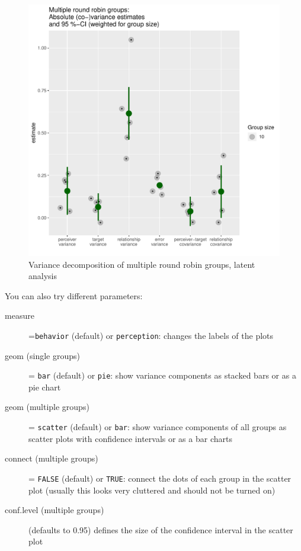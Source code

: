\documentclass[a4paper]{article}\usepackage[]{graphicx}\usepackage[]{color}
\makeatletter
\def\maxwidth{ %
  \ifdim\Gin@nat@width>\linewidth
    \linewidth
  \else
    \Gin@nat@width
  \fi
}
\newenvironment{kframe}{%
 \def\at@end@of@kframe{}%
 \ifinner\ifhmode%
  \def\at@end@of@kframe{\end{minipage}}%
  \begin{minipage}{\columnwidth}%
 \fi\fi%
 \def\FrameCommand##1{\hskip\@totalleftmargin \hskip-\fboxsep
 \colorbox{shadecolor}{##1}\hskip-\fboxsep
     \hskip-\linewidth \hskip-\@totalleftmargin \hskip\columnwidth}%
 \MakeFramed {\advance\hsize-\width
   \@totalleftmargin\z@ \linewidth\hsize
   \@setminipage}}%
 {\par\unskip\endMakeFramed%
 \at@end@of@kframe}
\newenvironment{knitrout}{}{} %
\makeatother
\begin{document}
\begin{figure} 
\begin{center} 
\begin{knitrout}\small
{}\color{fgcolor}\begin{kframe}


{\ttfamily\noindent\color{warningcolor}{\#\# Warning: Removed 1 rows containing missing values (geom\_segment).}}\end{kframe}
\includegraphics[width=\maxwidth]{Sweave-Files/Sw_unnamed-chunk-23-1} 
\end{knitrout}
\end{center}
\caption{Variance decomposition of multiple round robin groups, latent analysis}
\label{fig:two}
\end{figure}


You can also try different parameters:
\begin{description}
	\item[measure] =\texttt{behavior} (default) or \texttt{perception}: changes the labels of the plots
	\item[geom (single groups)] = \texttt{bar} (default) or \texttt{pie}: show variance components as stacked bars or as a pie chart
	\item[geom (multiple groups)] = \texttt{scatter} (default) or \texttt{bar}: show variance components of all groups as scatter plots with confidence intervals or as a bar charts
	\item[connect (multiple groups)] = \texttt{FALSE} (default) or \texttt{TRUE}: connect the dots of each group in the scatter plot (usually this looks very cluttered and should not be turned on)
	\item[conf.level (multiple groups)] (defaults to 0.95) defines the size of the confidence interval in the scatter plot
\end{description}
\end{document}
